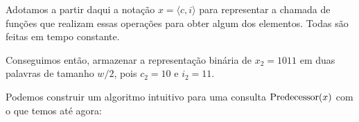 Adotamos a partir daqui a notação $x=\langle c,i \rangle$ para representar a
chamada de funções que realizam essas operações para obter algum dos elementos.
Todas são feitas em tempo constante.    

Conseguimos então, armazenar a representação binária de $x_2=1011$ em duas
palavras de tamanho $w/2$, pois $c_2=10$ e $i_2=11$.

%
%
%
%
%
%    
%
%
%

Podemos construir um algoritmo intuitivo para uma consulta $\operatorname{Predecessor}(x)$ com
o que temos até agora:


